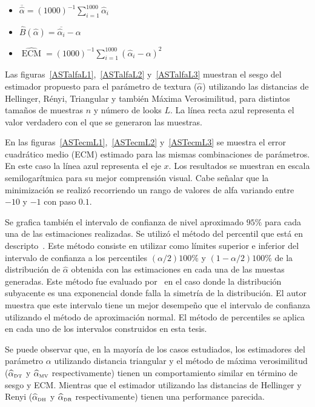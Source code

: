 \begin{itemize}
	\item $\overline{\widehat{\alpha}}=(1000)^{-1}{\sum_{i=1}^{1000}{\widehat{\alpha}_i}}$
	\item $\widehat{B}(\widehat\alpha) = \overline{\widehat\alpha_i}- \alpha$
	\item $\widehat{\operatorname{\text{ECM}}}=({1000})^{-1}{\sum_{i=1}^{1000}{(\widehat{\alpha}_i-\alpha)^2}}$
\end{itemize}


Las figuras~\ref{ASTalfaL1},~\ref{ASTalfaL2} y~\ref{ASTalfaL3} muestran el sesgo del estimador propuesto para el parámetro de textura ($\widehat{\alpha}$) utilizando las distancias de Hellinger, Rényi, Triangular y también Máxima Verosimilitud, para distintos tamaños de muestras $n$ y número de looks $L$. 
La línea recta azul representa el valor verdadero con el que se generaron las muestras. 

En las figuras~\ref{ASTecmL1},~\ref{ASTecmL2} y~\ref{ASTecmL3} se muestra el error cuadrático medio (ECM) estimado para las mismas combinaciones de parámetros. En este caso la línea azul representa el eje $x$. Los resultados se muestran en escala semilogarítmica para su mejor comprensión visual.
Cabe señalar que la minimización se realizó recorriendo un rango de valores de alfa variando entre $-10$ y $-1$ con paso  $0.1$. 

Se grafica también el intervalo de confianza de nivel aproximado $95\%$ para cada una de las estimaciones realizadas. Se utilizó el método del percentil que está en descripto~\cite{Buckland1983}. Este método consiste en utilizar como límites superior e inferior del intervalo de confianza a los percentiles $(\alpha/2) 100\%$ y $(1-\alpha/2) 100\%$ de la distribución de $\widehat{\alpha}$ obtenida con las estimaciones en cada una de las muestas generadas. Este método fue evaluado por~\cite{Buckland1983} en el caso donde la distribución subyacente es una exponencial donde falla la simetría de la distribución. El autor muestra que este intervalo tiene un mejor desempeño que el intervalo de confianza utilizando el método de aproximación normal. El método de percentiles se aplica en cada uno de los intervalos construidos en esta tesis.

 Se puede observar que, en la mayoría de los casos estudiados, los estimadores del parámetro $\alpha$ utilizando distancia triangular y el método de máxima verosimilitud ($\widehat{\alpha}_{\text{\tiny{DT}}}$ y $\widehat{\alpha}_{\text{\tiny{MV}}}$ respectivamente) tienen un comportamiento similar en término de sesgo y ECM. Mientras que  el estimador utilizando las distancias de Hellinger y Renyi ($\widehat{\alpha}_{\text{\tiny{DH}}}$ y $\widehat{\alpha}_{\text{\tiny{DR}}}$ respectivamente) tienen una performance parecida. 
 
